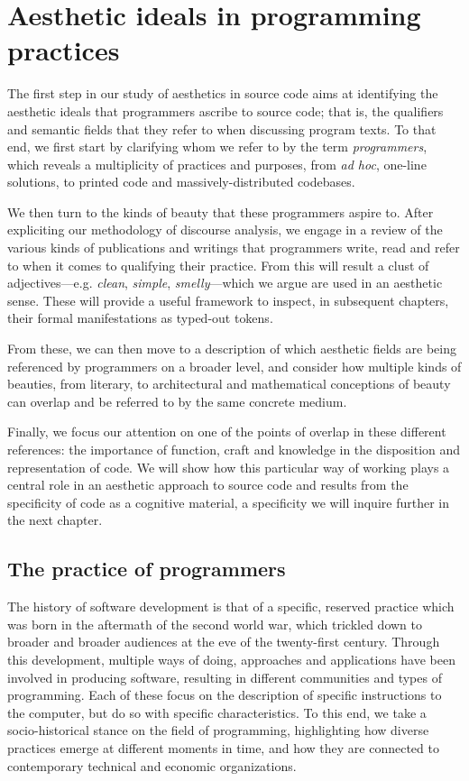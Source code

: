 \chapter{Aesthetic ideals in programming practices}

The first step in our study of aesthetics in source code aims at identifying the aesthetic ideals that programmers ascribe to source code; that is, the qualifiers and semantic fields that they refer to when discussing program texts. To that end, we first start by clarifying whom we refer to by the term \emph{programmers}, which reveals a multiplicity of practices and purposes, from \emph{ad hoc}, one-line solutions, to printed code and massively-distributed codebases.

We then turn to the kinds of beauty that these programmers aspire to. After expliciting our methodology of discourse analysis, we engage in a review of the various kinds of publications and writings that programmers write, read and refer to when it comes to qualifying their practice. From this will result a clust of adjectives—e.g. \emph{clean}, \emph{simple}, \emph{smelly}—which we argue are used in an aesthetic sense. These will provide a useful framework to inspect, in subsequent chapters, their formal manifestations as typed-out tokens.

From these, we can then move to a description of which aesthetic fields are being referenced by programmers on a broader level, and consider how multiple kinds of beauties, from literary, to architectural and mathematical conceptions of beauty can overlap and be referred to by the same concrete medium.

Finally, we focus our attention on one of the points of overlap in these different references: the importance of function, craft and knowledge in the disposition and representation of code. We will show how this particular way of working  plays a central role in an aesthetic approach to source code and results from the specificity of code as a cognitive material, a specificity we will inquire further in the next chapter.

\section{The practice of programmers}

The history of software development is that of a specific, reserved practice which was born in the aftermath of the second world war, which trickled down to broader and broader audiences at the eve of the twenty-first century. Through this development, multiple ways of doing, approaches and applications have been involved in producing software, resulting in different communities and types of programming. Each of these focus on the description of specific instructions to the computer, but do so with specific characteristics. To this end, we take a socio-historical stance on the field of programming, highlighting how diverse practices emerge at different moments in time, and how they are connected to contemporary technical and economic organizations.

